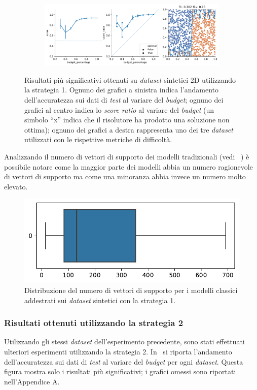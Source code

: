 \begin{figure}
\begin{subfigure}{.5\textwidth}
    \end{subfigure}%
    \hfill
    \begin{subfigure}{.5\textwidth}
        \centering
        \includegraphics[width=\textwidth]{img/2d/15.pdf}
    \end{subfigure}%
    \caption[Risultati su \emph{dataset} sintetici utilizzando la strategia 1.]{Risultati più significativi ottenuti su \emph{dataset} sintetici 2D utilizzando la strategia 1. Ognuno dei grafici a sinistra indica l'andamento dell'accuratezza sui dati di \emph{test} al variare del \emph{budget}; ognuno dei grafici al centro indica lo \emph{score ratio} al variare del \emph{budget} (un simbolo ``x'' indica che il risolutore ha prodotto una soluzione non ottima); ognuno dei grafici a destra rappresenta uno dei tre \emph{dataset} utilizzati con le rispettive metriche di difficoltà.}
\label{fig:risultati_2d}
\end{figure}


Analizzando il numero di vettori di supporto dei modelli tradizionali (vedi ~) è possibile notare come la maggior parte dei modelli abbia un numero ragionevole di vettori di supporto ma come una minoranza abbia invece un numero molto elevato.
\begin{figure}
    \centering
    \includegraphics[width=0.5\linewidth]{img/2d/numsv.pdf}
    \caption{Distribuzione del numero di vettori di supporto per i modelli classici addestrati sui \emph{dataset} sintetici con la strategia 1.}
    \label{fig:2d_dist_numsv}
\end{figure}

\subsubsection{Risultati ottenuti utilizzando la strategia 2}
Utilizzando gli stessi \emph{dataset} dell'esperimento precedente, sono stati effettuati ulteriori esperimenti utilizzando la strategia 2.
In~ si riporta l'andamento dell'accuratezza sui dati di \emph{test} al variare del \emph{budget} per ogni \emph{dataset}.
Questa figura mostra solo i risultati più significativi; i grafici omessi sono riportati nell'Appendice A.

